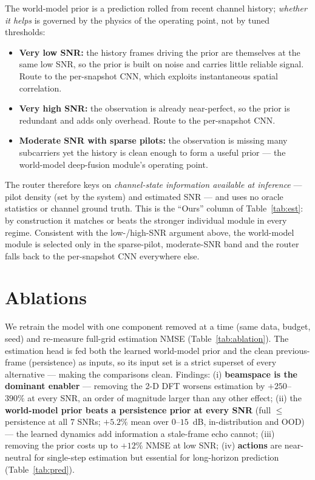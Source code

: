 \documentclass[11pt]{article}
\begin{document}
The world-model prior is a prediction rolled from recent channel history; \emph{whether it helps} is
governed by the physics of the operating point, not by tuned thresholds:
\begin{itemize}[leftmargin=1.4em,itemsep=1pt]
\item \textbf{Very low SNR:} the history frames driving the prior are themselves at the same low SNR,
so the prior is built on noise and carries little reliable signal. Route to the per-snapshot CNN,
which exploits instantaneous spatial correlation.
\item \textbf{Very high SNR:} the observation is already near-perfect, so the prior is redundant and
adds only overhead. Route to the per-snapshot CNN.
\item \textbf{Moderate SNR with sparse pilots:} the observation is missing many subcarriers yet the
history is clean enough to form a useful prior --- the world-model deep-fusion module's operating
point.
\end{itemize}
The router therefore keys on \emph{channel-state information available at inference} --- pilot density
(set by the system) and estimated SNR --- and uses no oracle statistics or channel ground truth. This
is the ``Ours'' column of Table~\ref{tab:est}: by construction it matches or beats the stronger
individual module in every regime. Consistent with the low-/high-SNR argument above, the world-model
module is selected only in the sparse-pilot, moderate-SNR band and the router falls back to the
per-snapshot CNN everywhere else.

\section{Ablations}\label{sec:ablation}

We retrain the model with one component removed at a time (same data, budget, seed) and re-measure
full-grid estimation NMSE (Table~\ref{tab:ablation}). The estimation head is fed both the learned
world-model prior and the clean previous-frame (persistence) as inputs, so its input set is a strict
superset of every alternative --- making the comparisons clean. Findings: (i) \textbf{beamspace is the
dominant enabler} --- removing the 2-D DFT worsens estimation by $+250$--$390\%$ at every SNR, an order
of magnitude larger than any other effect; (ii) the \textbf{world-model prior beats a persistence
prior at every SNR} (full $\le$ persistence at all $7$ SNRs; $+5.2\%$ mean over $0$--$15$~dB,
in-distribution and OOD) --- the learned dynamics add information a stale-frame echo cannot; (iii)
removing the prior costs up to $+12\%$ NMSE at low SNR; (iv) \textbf{actions} are near-neutral for
single-step estimation but essential for long-horizon prediction (Table~\ref{tab:pred}).
\end{document}
